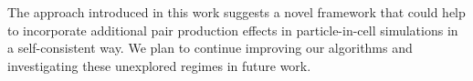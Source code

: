 The approach introduced in this work suggests a novel framework that could help to incorporate additional pair production effects in particle-in-cell simulations in a self-consistent way. We plan to continue improving our algorithms and investigating these unexplored regimes in future work.








